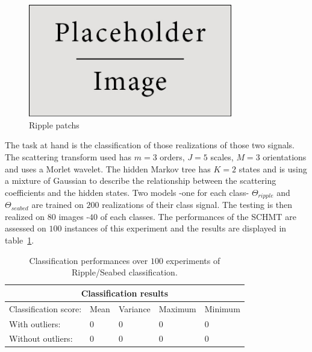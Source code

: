 \documentclass[a4paper,11pt]{report}
\begin{document}
{		\begin{figure}
			\begin{center}
				\includegraphics[width=3.5in]{placeholder.jpg}
				\caption{Ripple patchs}
				\label{fig:Ripple patch}
			\end{center}
		\end{figure}
		
		The task at hand is the classification of those realizations of those two signals. The scattering transform used has $m=3$ orders, $J=5$ scales, $M=3$ orientations and uses a Morlet wavelet. The hidden Markov tree has $K=2$ states and is using a mixture of Gaussian to describe the relationship between the scattering coefficients and the hidden states. Two models -one for each class- $\Theta_{ripple}$ and $\Theta_{seabed}$ are trained on $200$ realizations of their class signal. The testing is then realized on $80$ images -$40$ of each classes. The performances of the SCHMT are assessed on $100$ instances of this experiment and the results are displayed in table~\ref{tab:Clf_ripple}.\\
		
		\begin{center}
			\begin{table}
				\begin{center}				
					\begin{tabular}{ |p{3cm}||p{2cm}|p{2cm}|p{2cm}|p{2cm}|  }
						\hline
						\multicolumn{5}{|c|}{Classification results} \\
						\hline
						Classification score:		& Mean	& Variance	& Maximum	& Minimum \\
						\hline
						With outliers:					& 0	    & 0					& 0				& 0\\
						Without outliers:				& 0	    & 0					& 0				& 0\\
						\hline
					\end{tabular}
				\end{center}
				\label{tab:Clf_ripple}
				\caption{Classification performances over $100$ experiments of Ripple/Seabed classification.}
			\end{table}
		\end{center}
		
}
\end{document}
